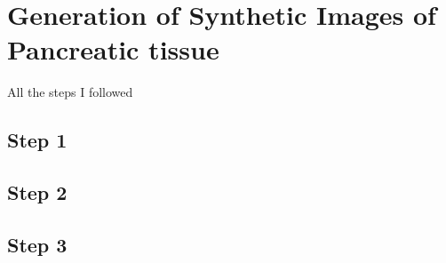 \chapter{Generation of Synthetic Images of Pancreatic tissue}
All the steps I followed

\section{Step 1}

\section{Step 2}

\section{Step 3}
